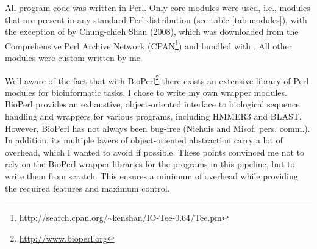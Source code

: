 All program code was written in Perl. Only core modules were used, i.e., modules
that are present in any standard Perl distribution (see table \ref{tab:modules}),
with the exception of  by Chung-chieh Shan (2008), which was
downloaded from the Comprehensive Perl Archive Network
(CPAN\footnote{\url{http://search.cpan.org/~kenshan/IO-Tee-0.64/Tee.pm}}) and
bundled with \pname. All other modules were custom-written by me.



Well aware of the fact that with BioPerl\footnote{\url{http://www.bioperl.org}}
there exists an extensive library of Perl modules for bioinformatic tasks, I
chose to write my own wrapper modules. BioPerl provides an exhaustive,
object-oriented interface to biological sequence handling and wrappers for
various programs, including HMMER3 and BLAST. However, BioPerl has not always
been bug-free (Niehuis and Misof, pers. comm.). In addition, its multiple layers
of object-oriented abstraction carry a lot of overhead, which I wanted to avoid
if possible. These points convinced me not to rely on the BioPerl wrapper
libraries for the programs in this pipeline, but to write them from scratch.
This ensures a minimum of overhead while providing the required features and
maximum control.
